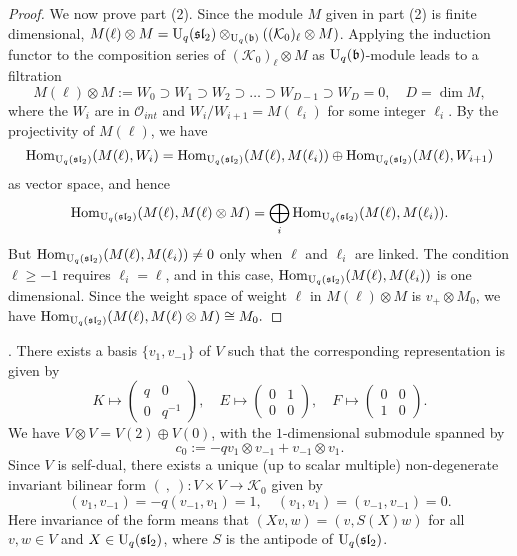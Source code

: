 \documentclass[12pt]{amsart}
\theoremstyle{definition}
\theoremstyle{remark}
\numberwithin{equation}{section}
\newcommand{\CO}{{\mathcal O}}
\newcommand{\CK}{{\mathcal K}}
\newcommand{\mf}{\mathfrak}
\newcommand{\fb}{{\mf b}}
\newcommand{\U}{{\rm{U}}}
\newcommand{\Hom}{{\rm{Hom}}}
\newcommand{\fsl}{{\mathfrak {sl}}}
\newcommand{\ot}{\otimes}
\begin{document}
\begin{proof}
We now prove part (2). 
Since the module $M$ given in part (2) is finite dimensional, $M(\ell)\otimes M= \U_q(\fsl_2)\otimes_{\U_q(\fb)}((\CK_0)_\ell\otimes M)$. 
Applying the induction functor to the composition series of $(\CK_0)_\ell\otimes M$ as $\U_q(\fb)$-module leads to a filtration 
\[
M(\ell)\otimes M:=W_0\supset W_1\supset W_2 \supset \dots \supset W_{D-1}\supset W_D=0, \quad D=\dim M, 
\]
where the $W_i$ are in $\CO_{int}$ and $W_i/W_{i+1}=M(\ell_i)$ for some integer $\ell_i$. By the projectivity of $M(\ell)$, we have 
\[
\Hom_{\U_q(\fsl_2)}(M(\ell), W_i) =\Hom_{\U_q(\fsl_2)}(M(\ell), M(\ell_i))\oplus \Hom_{\U_q(\fsl_2)}(M(\ell), W_{i+1})
\]
 as vector space,  and hence 
\[
\Hom_{\U_q(\fsl_2)}(M(\ell), M(\ell)\otimes M) = \bigoplus_i \Hom_{\U_q(\fsl_2)}(M(\ell), M(\ell_i)). 
\]
But $\Hom_{\U_q(\fsl_2)}(M(\ell), M(\ell_i))\ne 0$ only when $\ell$ and $\ell_i$ are linked. 
The condition $\ell\ge -1$ requires $\ell_i=\ell$, and in this case,  $\Hom_{\U_q(\fsl_2)}(M(\ell), M(\ell_i))$
 is one dimensional.  Since the weight space of weight  $\ell$ in $M(\ell)\ot M$ is $v_+\ot M_0$, we have
$
\Hom_{\U_q(\fsl_2)}(M(\ell), M(\ell)\otimes M) \cong M_0. 
$
\end{proof}


. There exists a basis $\{v_1, v_{-1}\}$ of $V$ such that the corresponding representation is given by 
\[
K \mapsto \begin{pmatrix} q & 0\\ 0 & q^{-1}\end{pmatrix}, \quad E\mapsto \begin{pmatrix} 0 & 1\\ 0 & 0 \end{pmatrix}, 
\quad F\mapsto \begin{pmatrix} 0 & 0\\ 1& 0 \end{pmatrix}. 
\]
We have $V\otimes V=V(2)\oplus V(0)$, with the $1$-dimensional submodule spanned by
\[
c_0:= -q v_1\otimes v_{-1} + v_{-1}\otimes v_1. 
\]
Since $V$ is self-dual, there exists a unique (up to scalar multiple)  non-degenerate  invariant bilinear form 
$(\ , \ ): V\times V\longrightarrow \CK_0$ given by 
\[
(v_1, v_{-1})=-q (v_{-1}, v_1)=1, \quad (v_1, v_1)=(v_{-1}, v_{-1})=0.
\]
Here invariance of the form means that  
$(X v, w) = (v, S(X) w)$ for all $v, w\in V$ and $X\in \U_q(\fsl_2)$, where $S$ is the antipode of $\U_q(\fsl_2)$. 
\end{document}
